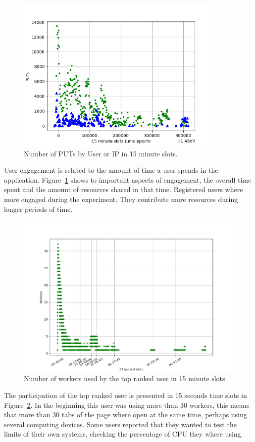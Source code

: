 \documentclass{llncs}
\begin{document}
\begin{figure}[htb]
    \centering
        \includegraphics[width=4in]{img/puts_by_time.png}
    \caption{Number of PUTs by User or IP in 15 minute slots.
    }
    \label{fig:puts-time}
\end{figure}
%
User engagement is related to the amount of time a user spends in the 
application. Figure~\ref{fig:puts-time} shows to important aspects of
engagement, the overall time spent and the amount of resources shared
in that time. Registered users where more engaged during the experiment.
They contribute more resources during longer periods of time.

\begin{figure}[htb]
    \centering
        \includegraphics[width=5in]{img/workers_best_user.png}
    \caption{ Number of workers used by the top ranked user in 15 minute slots.
    }
    \label{fig:top-user}
\end{figure}
%
The participation of the top ranked user is presented in 15 seconds time slots in
Figure~\ref{fig:top-user}. In the beginning this user was using more than 30
workers, this means that more than 30 tabs of the page where open at the
same time, perhaps using several computing devices. Some users reported that 
they wanted to test the limits of their own systems, checking the percentage of
CPU they where using. 
\end{document}
